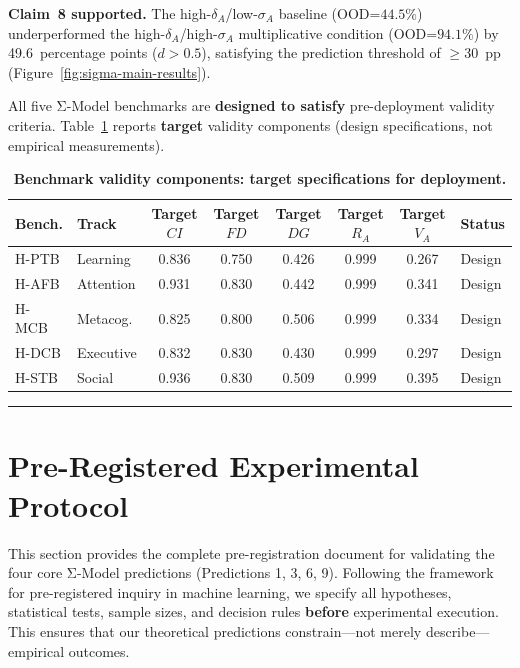 \documentclass[11pt,a4paper]{article}
\begin{document}
\textbf{Claim~8 supported.} The high-$\delta_A$/low-$\sigma_A$ baseline
(OOD=$44.5\%$) underperformed the high-$\delta_A$/high-$\sigma_A$
multiplicative condition (OOD=$94.1\%$) by 49.6~percentage points
($d>0.5$), satisfying the prediction threshold of $\geq$30~pp
(Figure~\ref{fig:sigma-main-results}).

All five Σ-Model benchmarks are \textbf{designed to satisfy} pre-deployment
validity criteria. Table~\ref{tab:validity} reports \textbf{target} validity
components (design specifications, not empirical measurements).

\begin{table}[htbp]
\centering
\caption{\textbf{Benchmark validity components: target specifications for deployment.}}
\label{tab:validity}
\small
\begin{tabular}{l l c c c c c l}
\toprule
\textbf{Bench.} & \textbf{Track} & \textbf{Target $CI$} & \textbf{Target $FD$} & \textbf{Target $DG$} & \textbf{Target $R_A$} & \textbf{Target $V_A$} & \textbf{Status} \\
\midrule
H-PTB & Learning & 0.836 & 0.750 & 0.426 & 0.999 & 0.267 & Design \\
H-AFB & Attention & 0.931 & 0.830 & 0.442 & 0.999 & 0.341 & Design \\
H-MCB & Metacog. & 0.825 & 0.800 & 0.506 & 0.999 & 0.334 & Design \\
H-DCB & Executive & 0.832 & 0.830 & 0.430 & 0.999 & 0.297 & Design \\
H-STB & Social & 0.936 & 0.830 & 0.509 & 0.999 & 0.395 & Design \\
\bottomrule
\end{tabular}
\end{table}

\noindent\rule{\linewidth}{0.4pt}

\section{Pre-Registered Experimental Protocol}\label{sec:empirical-validation}

This section provides the complete pre-registration document for
validating the four core Σ-Model predictions (Predictions 1, 3, 6, 9).
Following the framework for pre-registered inquiry in machine learning,
we specify all hypotheses, statistical tests, sample sizes, and decision
rules \textbf{before} experimental execution. This ensures that our
theoretical predictions constrain---not merely describe---empirical
outcomes.
\end{document}
